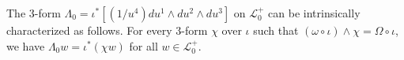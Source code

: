 The 3-form $\Lambda_0 = \iota^*[(1/u^4) du^1 \wedge du^2 \wedge du^3]$ on $\mathcal{L}_0^+$ can be intrinsically characterized as follows. For every 3-form $\chi$ over $\iota$ such that $(\omega \circ \iota) \wedge \chi = \Omega \circ \iota$, we have $\Lambda_0 w = \iota^*(\chi w)$ for all $w \in \mathcal{L}_0^+$.
